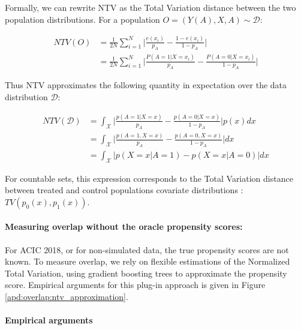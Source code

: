\documentclass{report}
\begin{document}
\begin{appendices}
  Formally, we can rewrite NTV as the Total Variation distance
  between the two population distributions. For a population $O = (Y(A), X, A)
    \sim \mathcal{D}$:

  \begin{align*}
    NTV(O) & = \frac{1}{2N} \sum_{i =1}^{N} \big | \frac{e(x_i)}{p_A}-\frac{1-e(x_i)}{1-{p_A}} \big|         \\
           & = \frac{1}{2N} \sum_{i =1}^{N} \big|\frac{P(A=1|X=x_i)}{p_A}-\frac{P(A=0|X=x_i)}{1-{p_A}} \big|
  \end{align*}

  Thus NTV approximates the following quantity in expectation over the data
  distribution $\mathcal{D}$:

  \begin{align*}
    NTV(\mathcal{D}) & = \int_{\mathcal{X}} \big | \frac{p(A=1|X=x)}{p_A}-\frac{p(A=0|X=x)}{1-{p_A}} \big | p(x)dx \\
                     & = \int_{\mathcal{X}} \big | \frac{p(A=1, X=x)}{p_A}-\frac{p(A=0, X=x)}{1-{p_A}} \big |dx    \\
                     & = \int_{\mathcal{X}} \big | p(X=x|A=1)- p(X=x|A=0) \big |dx
  \end{align*}

  For countable sets, this expression corresponds to the Total Variation distance
  between treated and control populations covariate distributions : $TV(p_0(x),
    p_1(x))$.

  \paragraph{Measuring overlap without the oracle propensity scores:} For ACIC
  2018, or for non-simulated data, the true propensity scores are not known. To
  measure overlap, we rely on flexible estimations of the Normalized Total
  Variation, using gradient boosting trees to approximate the propensity score.
  Empirical arguments for this plug-in approach is given in Figure
  \ref{apd:overlap:ntv_approximation}.

  \paragraph{Empirical arguments}


\end{appendices}
\end{document}
